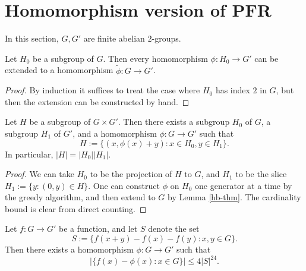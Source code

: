 \chapter{Homomorphism version of PFR}

In this section, $G, G'$ are finite abelian $2$-groups.

\begin{lemma}\label{hb-thm}\leanok  Let $H_0$ be a subgroup of $G$.  Then every homomorphism $\phi: H_0 \to G'$ can be extended to a homomorphism $\tilde \phi: G \to G'$.
\end{lemma}

\begin{proof}\leanok  By induction it suffices to treat the case where $H_0$ has index $2$ in $G$, but then the extension can be constructed by hand.
\end{proof}

\begin{lemma}\label{goursat}\leanok  Let $H$ be a subgroup of $G \times G'$.  Then there exists a subgroup $H_0$ of $G$, a subgroup $H_1$ of $G'$, and a homomorphism $\phi: G \to G'$ such that
$$ H := \{ (x, \phi(x) + y): x \in H_0, y \in H_1 \}.$$
In particular, $|H| = |H_0| |H_1|$.
\end{lemma}

\begin{proof} We can take $H_0$ to be the projection of $H$ to $G$, and $H_1$ to be the slice $H_1 := \{ y: (0,y) \in H \}$.  One can construct $\phi$ on $H_0$ one generator at a time by the greedy algorithm, and then extend to $G$ by Lemma \ref{hb-thm}.  The cardinality bound is clear from direct counting.
\end{proof}

\begin{theorem}\label{hom-pfr}\leanok  Let $f: G \to G'$ be a function, and let $S$ denote the set
$$ S := \{ f(x+y)-f(x)-f(y): x,y \in G \}.$$
Then there exists a homomorphism $\phi: G \to G'$ such that
$$ |\{ f(x) - \phi(x): x \in G \}| \leq 4 |S|^{24}.$$
\end{theorem}

